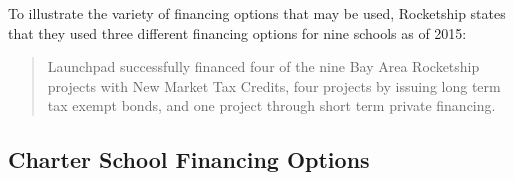 To illustrate the variety of financing options that may be used, Rocketship states that they used three different financing options for nine schools as of 2015:
\begin{quotation}\noindent
Launchpad successfully financed four of the nine Bay Area Rocketship projects with New
Market Tax Credits, four projects by issuing long term tax exempt bonds, and one project
through short term private financing. 
\end{quotation}

\subsection{Charter School Financing Options}
\label{sec:charter-school-financing-options}\indent%

